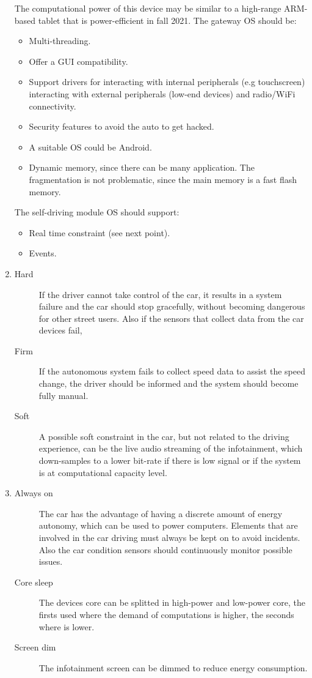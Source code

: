 \documentclass[a4paper, 12pt]{article}
\begin{document}
\begin{exercise}
\begin{enumerate}
		The computational power of this device may be similar to a high-range
		ARM-based tablet that is power-efficient in fall 2021.
		The gateway OS should be: 
		\begin{itemize}
		    \item Multi-threading.
			\item Offer a GUI compatibility.
			\item Support drivers for interacting with internal peripherals 
				(e.g touchscreen) interacting with external peripherals (low-end
				devices) and radio/WiFi connectivity.
			\item Security features to avoid the auto to get hacked.
			\item A suitable OS could be Android.
			\item Dynamic memory, since there can be many application. The
				fragmentation is not problematic, since the main memory is a
				fast flash memory. 
		\end{itemize}
		The self-driving module OS should support: 
		\begin{itemize}
			\item Real time constraint (see next point).
			\item Events. 
		\end{itemize}
	\item 
		\begin{description}
		    \item[Hard] If the driver cannot take control of the car, it results
				in a system failure and the car should stop gracefully, without
				becoming dangerous for other street users. Also if the sensors
				that collect data from the car devices fail, 
			\item[Firm] If the autonomous system fails to collect speed data to
				assist the speed change, the driver should be informed and the
				system should become fully manual. 
			\item[Soft] A possible soft constraint in the car, but not related
				to the driving experience, can be the live audio streaming of
				the infotainment, which down-samples to a lower bit-rate if there
				is low signal or if the system is at computational capacity
				level. 
		\end{description}
	\item 
		\begin{description}
		    \item[Always on] The car has the advantage of having a discrete
				amount of energy autonomy, which can be used to power computers.
			Elements that are involved in the car driving must always be kept
			on to avoid incidents. Also the car condition sensors should
			continuously monitor possible issues. 
		\item[Core sleep] The devices core can be splitted in high-power and
			low-power core, the firsts used where the demand of computations is
			higher, the seconds where is lower.
			\item[Screen dim] The infotainment screen can be dimmed to reduce
				energy consumption.
		\end{description}
\end{enumerate}
\end{exercise}
\end{document}
